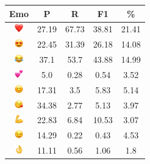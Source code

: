 \documentclass{article}
\begin{document}
\begin{table}
\centering
\begin{tabular}{|c|ccc|c|} \hline
\textbf{Emo} & \textbf{P} & \textbf{R} & \textbf{F1} & \textbf{\%} \\ \hline
\includegraphics[height=0.37cm,width=0.37cm]{img/red_heart.png} & 27.19 & 67.73 & 38.81 & 21.41\\ 
\includegraphics[height=0.37cm,width=0.37cm]{img/smiling_face_with_hearteyes.png} & 22.45 & 31.39 & 26.18 & 14.08\\ 
\includegraphics[height=0.37cm,width=0.37cm]{img/face_with_tears_of_joy.png} & 37.1 & 53.7 & 43.88 & 14.99\\ 
\includegraphics[height=0.37cm,width=0.37cm]{img/two_hearts.png} & 5.0 & 0.28 & 0.54 & 3.52\\ 
\includegraphics[height=0.37cm,width=0.37cm]{img/smiling_face_with_smiling_eyes.png} & 17.31 & 3.5 & 5.83 & 5.14\\ 
\includegraphics[height=0.37cm,width=0.37cm]{img/face_blowing_a_kiss.png} & 34.38 & 2.77 & 5.13 & 3.97\\ 
\includegraphics[height=0.37cm,width=0.37cm]{img/flexed_biceps.png} & 22.83 & 6.84 & 10.53 & 3.07\\ 
\includegraphics[height=0.37cm,width=0.37cm]{img/winking_face.png} & 14.29 & 0.22 & 0.43 & 4.53\\ 
\includegraphics[height=0.37cm,width=0.37cm]{img/OK_hand.png} & 11.11 & 0.56 & 1.06 & 1.8\\ 

\end{tabular}
\end{table}
\end{document}
